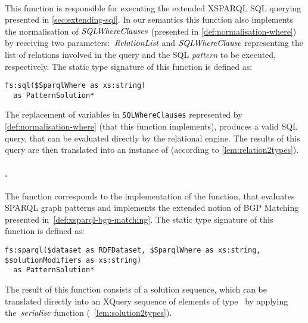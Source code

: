 \paragraph{}
%
This function is responsible for executing the extended XSPARQL \ac{SQL} querying presented in
\cref{sec:extending-sql}.
%
In our semantics this function also implements the normalisation of ${\textit{SQLWhereClauses}}$ (presented in
\cref{def:normalisation-where}) by receiving two parameters:~${\textit{RelationList}}$ and
${\textit{SQLWhereClause}}$ representing the list of relations involved in the query and the \ac{SQL} \emph{pattern}
to be executed, respectively.
%
The static type signature of this function is defined as:
%
{\small
\begin{verbatim}
fs:sql($SparqlWhere as xs:string)
  as PatternSolution*
\end{verbatim}
}%
%
The replacement of variables in \texttt{SQLWhereClauses} represented by \cref{def:normalisation-where} (that this
function implements), produces a valid \ac{SQL} query, that can be evaluated directly by the relational engine.
%
The results of this query are then translated into an instance of  (according to
\cref{lem:relation2types}).


\paragraph{.}
\label{sec:fs:sparql}
%
The  function corresponds to the implementation of the  function, that
evaluates SPARQL graph patterns and implements the extended notion of BGP Matching presented
in~\cref{def:xsparql-bgp-matching}.
%
The static type signature of this function is defined as:
%
{\small
\begin{verbatim}
fs:sparql($dataset as RDFDataset, $SparqlWhere as xs:string, $solutionModifiers as xs:string)
  as PatternSolution*
\end{verbatim}
}%
% 
\noindent The result of this function consists of a solution sequence, which can be translated directly into an XQuery
sequence of elements of type~ by applying the~$\mathit{serialise}$ function
(\cf~\cref{lem:solution2types}).





